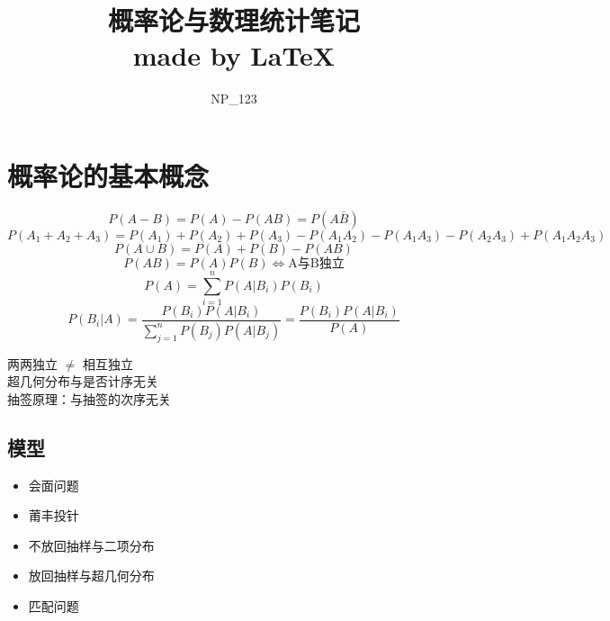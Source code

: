 \documentclass{article}
\title{\Huge 概率论与数理统计笔记    \\\large made by  \LaTeX}
\author{NP\_123}
\begin{document}
 
\maketitle
\clearpage
\section*{\center\Huge 概率论的基本概念}
\begin{large}
\begin{tcolorbox}
    [colback=Emerald!10,colframe=cyan!40!black,title=\textbf{公式}]
    \[P(A-B)=P(A)-P(AB)=P(A\bar{B})\]
    \[P(A_1+A_2+A_3)=P(A_1)+P(A_2)+P(A_3)-P(A_1A_2)-P(A_1A_3)-P(A_2A_3)+P(A_1A_2A_3)\]
    \[P(A\cup B)=P(A)+P(B)-P(AB)\]
    \[P(AB)=P(A)P(B)\Longleftrightarrow \mbox{A与B独立}\]
    \[P(A)=\sum_{i=1}^{n}P(A|B_i)P(B_i)\]
    \[P(B_i|A)=\frac{P(B_i)P(A|B_i)}{\sum_{j=1}^{n}P(B_j)P(A|B_j)}=\frac{P(B_i)P(A|B_i)}{P(A)}\]
\end{tcolorbox}
\end{large}

\begin{tcolorbox}
    [colback=brownshade,colframe=Sepia,title=\textbf{概念}]
    两两独立 $\neq$ 相互独立\\
    超几何分布与是否计序无关\\
    抽签原理：与抽签的次序无关
\end{tcolorbox}
\subsection*{模型}

\begin{itemize}
    \item 会面问题
    \item 莆丰投针
    \item 不放回抽样与二项分布
    \item 放回抽样与超几何分布
    \item 匹配问题
\end{itemize}
\clearpage
 
\end{document}
